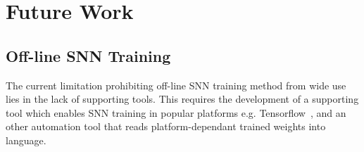 %



\section{Future Work}
\subsection{Off-line SNN Training}
The current limitation prohibiting \DIFdelbegin {}\DIFdelend \DIFaddbegin {}\DIFaddend off-line SNN training method from \DIFaddbegin {}\DIFaddend wide use lies in the lack of supporting tools.
This requires the development of a supporting tool which enables SNN training in popular \DIFdelbegin {}\DIFdelend \DIFaddbegin {}\DIFaddend platforms e.g. Tensorflow~\DIFdelbegin {}\DIFdelend \DIFaddbegin {}\DIFaddend , and an other automation tool that reads platform-dependant trained weights into \DIFdelbegin {}\DIFdelend \DIFaddbegin {}\DIFaddend language.


